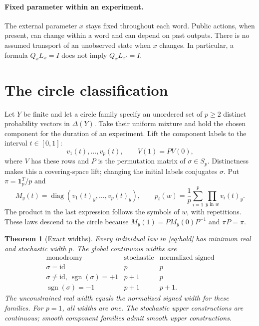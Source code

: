 \documentclass[11pt]{article}
\newtheorem{theorem}{Theorem}[section]
\theoremstyle{definition}\newtheorem{definition}[theorem]{Definition}
\theoremstyle{remark}\newtheorem{remark}[theorem]{Remark}
\newcommand{\one}{\mathbf 1}
\newcommand{\diag}{\operatorname{diag}}
\newcommand{\sgn}{\operatorname{sgn}}
\begin{document}
\paragraph{Fixed parameter within an experiment.}
The external parameter $x$ stays fixed throughout each word. Public actions, when present, can change within a word and can depend on past outputs. There is no assumed transport of an unobserved state when $x$ changes. In particular, a formula $Q_xL_x=I$ does not imply $Q_xL_{x'}=I$.

\section{The circle classification}
Let $Y$ be finite and let a circle family specify an unordered set of $p\geq2$ distinct probability vectors in $\Delta(Y)$. Take their uniform mixture and hold the chosen component for the duration of an experiment. Lift the component labels to the interval $t\in[0,1]$:
\[
 v_1(t),\ldots,v_p(t),\qquad V(1)=PV(0),
\]
where $V$ has these rows and $P$ is the permutation matrix of $\sigma\in S_p$. Distinctness makes this a covering-space lift; changing the initial labels conjugates $\sigma$. Put $\pi=\one_p^T/p$ and
\begin{equation}\label{eq:hold}
 M_y(t)=\diag(v_1(t)_y,\ldots,v_p(t)_y),\qquad
 p_t(w)=\frac1p\sum_{i=1}^p\prod_{y\text{ in }w}v_i(t)_y.
\end{equation}
The product in the last expression follows the symbols of $w$, with repetitions. These laws descend to the circle because $M_y(1)=PM_y(0)P^{-1}$ and $\pi P=\pi$.

\begin{theorem}[Exact widths]\label{thm:classification}
Every individual law in \eqref{eq:hold} has minimum real and stochastic width $p$. The global continuous widths are
\[
\begin{array}{c|cc}
\text{monodromy}&\text{stochastic}&\text{normalized signed}\\ \hline
\sigma=\mathrm{id}&p&p\\
\sigma\ne\mathrm{id},\ \sgn(\sigma)=+1&p+1&p\\
\sgn(\sigma)=-1&p+1&p+1.
\end{array}
\]
The unconstrained real width equals the normalized signed width for these families. For $p=1$, all widths are one. The stochastic upper constructions are continuous; smooth component families admit smooth upper constructions.
\end{theorem}
\end{document}
